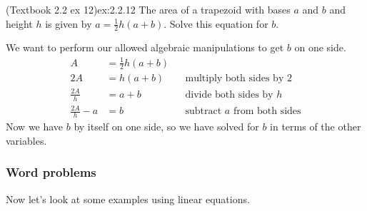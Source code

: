 \documentclass{article}
\begin{document}
\begin{example}{(Textbook 2.2 ex 12)}{ex:2.2.12}
    The area of a trapezoid with bases $a$ and $b$ and height $h$ is given by $a=\frac{1}{2}h(a+b)$. Solve this equation for $b$.
\end{example}
\begin{solution}
    We want to perform our allowed algebraic manipulations to get $b$ on one side.
    \begin{align*}
        A&=\frac{1}{2}h(a+b)\\
        2A&=h(a+b) && \text{multiply both sides by $2$}\\
        \frac{2A}{h}&=a+b && \text{divide both sides by $h$}\\
        \frac{2A}{h}-a&=b && \text{subtract $a$ from both sides}
    \end{align*}
    Now we have $b$ by itself on one side, so we have solved for $b$ in terms of the other variables.
\end{solution}

\subsubsection{Word problems}

Now let's look at some examples using linear equations.
\end{document}
